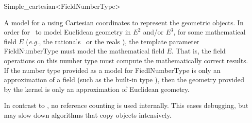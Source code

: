 \begin{ccRefClass}{Simple_cartesian<FieldNumberType>}


\ccDefinition
A model for a  using Cartesian coordinates to represent the
geometric objects. In order for \ccRefName\ to model Euclidean geometry
in $E^2$ and/or $E^3$, for some mathematical field $E$ (\textit{e.g.},
the rationals \Q\ or the reals \R), the template parameter FieldNumberType      
must model the mathematical field $E$.  That is, the field operations on this
number type must compute the mathematically correct results.  If the number
type provided as a model for FiedlNumberType is only an approximation of a
field (such as the built-in type ), then the geometry provided by
the kernel is only an approximation of Euclidean geometry.  



\ccIsModel
{}

\ccTypes
{}
\ccGlue
{}

\ccImplementation In contrast to , no reference counting
is used internally. This eases debugging, but may slow down algorithms
that copy objects intensively.

\ccSeeAlso
{} \\
 \\
 \\

\end{ccRefClass}
